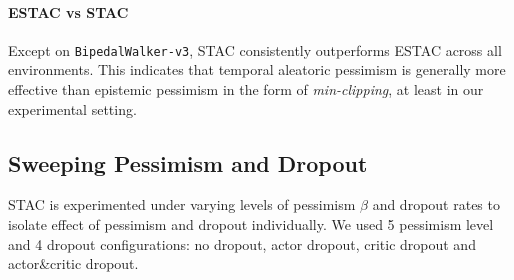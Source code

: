 \documentclass{article}
\begin{document}
\paragraph{ESTAC vs STAC} Except on \verb|BipedalWalker-v3|, STAC consistently outperforms ESTAC across all environments. This indicates that temporal aleatoric pessimism is generally more effective than epistemic pessimism in the form of \textit{min-clipping}, at least in our experimental setting. 


\subsection{Sweeping Pessimism and Dropout}

STAC is experimented under varying levels of pessimism $\beta$ and dropout rates to isolate effect of pessimism and dropout individually. We used 5 pessimism level and 4 dropout configurations: no dropout, actor dropout, critic dropout and actor\&critic dropout. 
\end{document}
